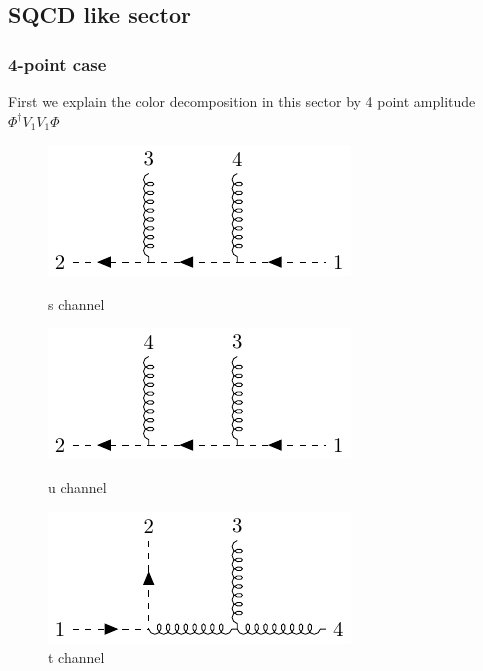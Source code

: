 \documentclass[12pt]{article}
\numberwithin{equation}{section}
\begin{document}
\subsection{SQCD like sector}
\subsubsection{4-point case}
First we explain the color decomposition in this sector by 4 point amplitude $\Phi^\dagger V_1V_1\Phi$
    \begin{figure}[htbp]
        \centering
        \begin{minipage}[t]{0.32\textwidth}
            \centering
            \includegraphics[width=\linewidth]{sch.pdf}
            \caption{s channel}
        \end{minipage}
        \hfill
        \begin{minipage}[t]{0.32\textwidth}
            \centering
            \includegraphics[width=\linewidth]{uch.pdf}
            \caption{u channel}
        \end{minipage}
        \hfill
        \begin{minipage}[t]{0.32\textwidth}
            \centering
            \includegraphics[width=\linewidth]{tch.pdf}
            \caption{t channel}
        \end{minipage}
    \end{figure}
\end{document}

